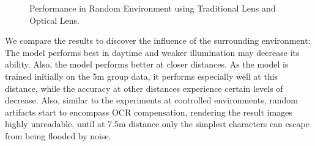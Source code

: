 \begin{figure}[!t]
    \centering
    \hfill
    \caption{Performance in Random Environment using Traditional Lens and Optical Lens.}
    \label{fig:control}
\end{figure}

We compare the results to discover the influence of the surrounding environment: The model performs best in daytime and weaker illumination may decrease its ability. Also, the model performs better at closer distances. As the model is trained initially on the 5m group data, it performs especially well at this distance, while the accuracy at other distances experience certain levels of decrease. Also, similar to the experiments at controlled environments, random artifacts start to encompass OCR compensation, rendering the result images highly unreadable, until at 7.5m distance only the simplest characters can escape from being flooded by noise.


